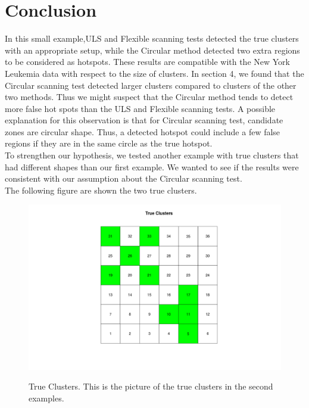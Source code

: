 \documentclass[12pt]{article}
\begin{document}
\section{Conclusion}

In this small example,ULS and Flexible scanning tests detected the true clusters with an appropriate setup, while the Circular method detected two extra regions to be considered as hotspots. These results are compatible with the New York Leukemia data with respect to the size of clusters. In section 4, we found that the Circular scanning test detected larger clusters compared to clusters of the other two methods. Thus we might suspect that the Circular method tends to detect more false hot spots than the ULS and Flexible scanning tests. A possible explanation for this observation is that for Circular scanning test, candidate zones are circular shape. Thus, a detected hotspot could include a few false regions if they are in the same circle as the true hotspot.\\  

To strengthen our hypothesis, we tested another example with true clusters that had different shapes than our first example. We wanted to see if the results were consistent with our assumption about the Circular scanning test.\\ 
The following figure are shown the two true clusters.\\

\begin{figure}[!ht]
	\centering
	\includegraphics[scale=0.2]{Ex2_True}\\
	\caption{True Clusters. This is the picture of the true clusters in the second examples. \label{f:gull}}
	
\end{figure}
\end{document}
